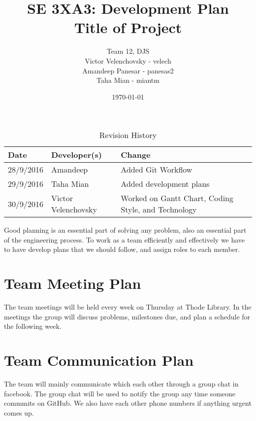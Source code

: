 \documentclass{article}
\title{SE 3XA3: Development Plan\\Title of Project}
\author{Team 12, DJS
		\\ Victor Velenchovsky - velech
		\\ Amandeep Panesar - panesas2
		\\ Taha Mian - miantm
}
\date{\today}
\begin{document}
\begin{table}[hp]
\caption{Revision History} \label{TblRevisionHistory}
\begin{tabularx}{\textwidth}{llX}
\toprule
\textbf{Date} & \textbf{Developer(s)} & \textbf{Change}\\
\midrule
28/9/2016 & Amandeep & Added Git Workflow\\
29/9/2016 & Taha Mian & Added development plans\\
30/9/2016 & Victor Velenchovsky  & Worked on Gantt Chart, Coding Style, and Technology \\
\bottomrule
\end{tabularx}
\end{table}

\newpage

\maketitle

Good planning is an essential part of solving any problem, also an essential part of the engineering process. To work as a team efficiently and effectively we have to have develop plans that we should follow, and assign roles to each member.

\section{Team Meeting Plan}
The team meetings will be held every week on Thursday at Thode Library. In the meetings the group will discuss problems, milestones due, and plan a schedule for the following week.
\section{Team Communication Plan}
The team will mainly communicate which each other through a group chat in facebook. The group chat will be used to notify the group any time someone commmits on GitHub. We also have each other phone numbers if anything urgent comes up.
\end{document}
